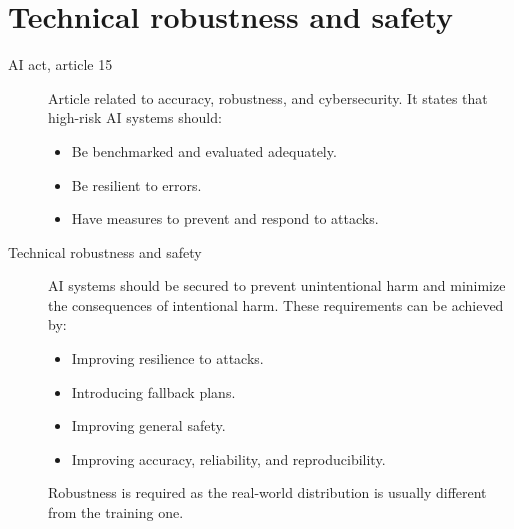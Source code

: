 \chapter{Technical robustness and safety}


\begin{description}
    \item[AI act, article 15] 
        Article related to accuracy, robustness, and cybersecurity. It states that high-risk AI systems should:
        \begin{itemize}
            \item Be benchmarked and evaluated adequately.
            \item Be resilient to errors.
            \item Have measures to prevent and respond to attacks.
        \end{itemize}

\end{description}

\begin{description}
    \item[Technical robustness and safety] 
        AI systems should be secured to prevent unintentional harm and minimize the consequences of intentional harm. These requirements can be achieved by:
        \begin{itemize}
            \item Improving resilience to attacks.
            \item Introducing fallback plans.
            \item Improving general safety.
            \item Improving accuracy, reliability, and reproducibility.
        \end{itemize}

        \begin{remark}
            Robustness is required as the real-world distribution is usually different from the training one.
        \end{remark}
\end{description}

